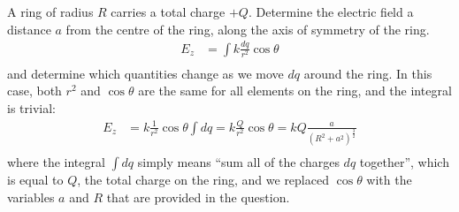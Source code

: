 \begin{example}{\label{ex:chargesfields:ring}A ring of radius $R$ carries a total charge $+Q$. Determine the electric field a distance $a$ from the centre of the ring, along the axis of symmetry of the ring.}
\begin{align*}
E_z &= \int k\frac{dq}{r^2}\cos\theta \\
\end{align*}
and determine which quantities change as we move $dq$ around the ring. In this case, both $r^2$ and $\cos\theta$ are the same for all elements on the ring, and the integral is trivial:
\begin{align*}
E_z &= k\frac{1}{r^2}\cos\theta\int dq=k\frac{Q}{r^2}\cos\theta=kQ\frac{a}{(R^2+a^2)^\frac{3}{2}}  \\
\end{align*}
where the integral $\int dq$ simply means ``sum all of the charges $dq$ together'', which is equal to $Q$, the total charge on the ring, and we replaced $\cos\theta$ with the variables $a$ and $R$ that are provided in the question.
\end{example}

